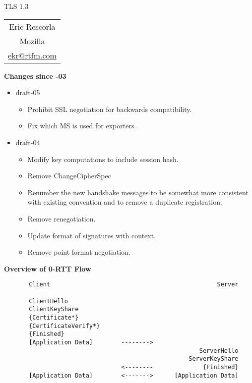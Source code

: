 \documentclass[helvetica]{seminar}
\newcommand{\heading}[1]{%
  \begin{center} 
    \large\bf 
    #1 
  \end{center} 
  \vspace{.4 in}}
\begin{document}
\begin{slide}
\begin{center}
\vspace{.5 in}
\LARGE{{\bf}TLS 1.3}\\
\vspace{.2in}
\large{
\begin{tabular}{c}
Eric Rescorla\\
Mozilla\\
\url{ekr@rtfm.com}
\end{tabular}
}
\end{center}

\end{slide}

\centerslidesfalse 


\begin{slide}
\heading{Changes since -03}


\begin{itemize}
\item draft-05
  \begin{itemize}
  \item Prohibit SSL negotiation for backwards compatibility.
  \item Fix which MS is used for exporters.
  \end{itemize}

\item draft-04
  \begin{itemize}
  \item Modify key computations to include session hash.
  \item Remove ChangeCipherSpec
  \item Renumber the new handshake messages to be somewhat more
    consistent with existing convention and to remove a duplicate
    registration.
  \item Remove renegotiation.
  \item Update format of signatures with context.
  \item Remove point format negotiation.
  \end{itemize}  
\end{itemize}
\end{slide}


\begin{slide}
\heading{Overview of 0-RTT Flow}

{\scriptsize
\begin{verbatim}
       Client                                               Server

       ClientHello
       ClientKeyShare
       {Certificate*}
       {CertificateVerify*}
       {Finished}              
       [Application Data]        -------->
                                                       ServerHello
                                                    ServerKeyShare
                                 <--------              {Finished}
       [Application Data]        <------->      [Application Data]
\end{verbatim}
}
\end{slide}
\end{document}
